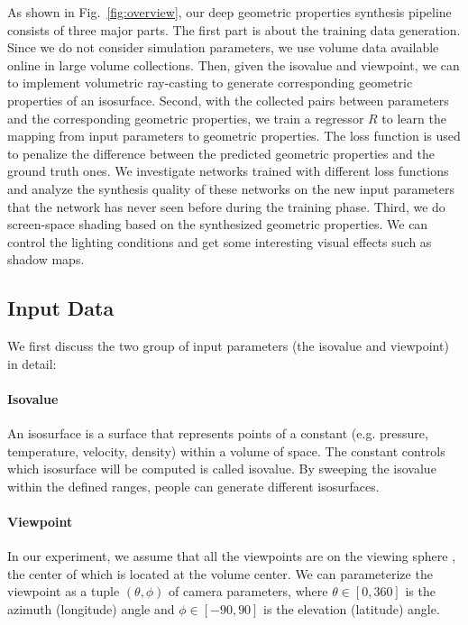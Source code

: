 \documentclass[journal]{vgtc}                %
\begin{document}
As shown in Fig.~\ref{fig:overview}, our deep geometric properties synthesis pipeline consists of three major parts. The first part is about the training data generation. Since we do not consider simulation parameters, we use volume data available online in large volume collections. Then, given the isovalue and viewpoint, we can to implement volumetric ray-casting to generate corresponding geometric properties of an isosurface. Second, with the collected pairs between parameters and the corresponding geometric properties, we train a regressor $R$ to learn the mapping from input parameters to geometric properties. The loss function is used to penalize the difference between the predicted geometric properties and the ground truth ones. We investigate networks trained with different loss functions and analyze the synthesis quality of these networks on the new input parameters that the network has never seen before during the training phase. Third, we do screen-space shading based on the synthesized geometric properties. We can control the lighting conditions and get some interesting visual effects such as shadow maps.

\subsection{Input Data}
\label{subsection:input}
We first discuss the two group of input parameters (the isovalue and viewpoint) in detail:

\paragraph{Isovalue}
An isosurface is a surface that represents points of a constant (e.g. pressure, temperature, velocity, density) within a volume of space. The constant controls which isosurface will be computed is called isovalue. By sweeping the isovalue within the defined ranges, people can generate different isosurfaces. 

\paragraph{Viewpoint}
In our experiment, we assume that all the viewpoints are on the viewing sphere \cite{Ji2006DVS}, the center of which is located at the volume center. We can parameterize the viewpoint as a tuple $(\theta, \phi)$ of camera parameters, where $\theta \in [0, 360]$ is the azimuth (longitude) angle and $\phi \in [-90,90]$ is the elevation (latitude) angle. 
\end{document}
